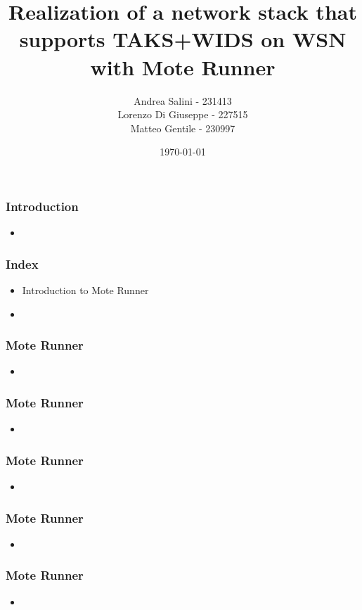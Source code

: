 \documentclass[12pt, compress]{beamer}
\title{Realization of a network stack that supports TAKS+WIDS on WSN with Mote Runner}
\subtitle{}
\date{\today}
\author{Andrea Salini - 231413\\Lorenzo Di Giuseppe - 227515\\Matteo Gentile - 230997}
\institute{DISIM - Università degli Studi dell’Aquila}
\begin{document}
  \maketitle
  
\begin{frame}[fragile]
  \frametitle{Introduction}
  \begin{itemize}
    \item 
  \end{itemize}
\end{frame}

\begin{frame}[fragile]
  \frametitle{Index}
  \begin{itemize}
    \item Introduction to Mote Runner
    \item 
  \end{itemize}
\end{frame}



\begin{frame}[fragile]
  \frametitle{Mote Runner}
  \begin{itemize}
  	\item 
  \end{itemize}
\end{frame}

\begin{frame}[fragile]
  \frametitle{Mote Runner}
  \begin{itemize}
  	\item 
  \end{itemize}
\end{frame}

\begin{frame}[fragile]
  \frametitle{Mote Runner}
  \begin{itemize}
  	\item 
  \end{itemize}
\end{frame}

\begin{frame}[fragile]
  \frametitle{Mote Runner}
  \begin{itemize}
  	\item 
  \end{itemize}
\end{frame}

\begin{frame}[fragile]
  \frametitle{Mote Runner}
  \begin{itemize}
  	\item 
  \end{itemize}
\end{frame}
\end{document}
